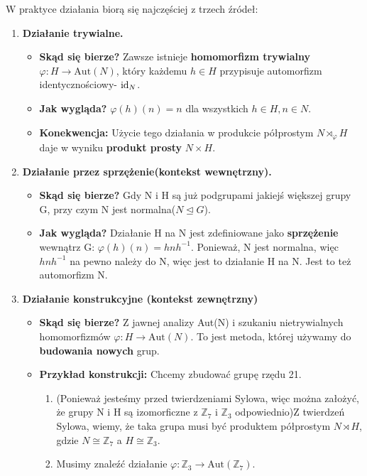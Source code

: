 \begin{remark}
W praktyce działania biorą się najczęściej z trzech źródeł:
\begin{enumerate}[label=\arabic*)]
	\item \textbf{Działanie trywialne.}
		\begin{itemize}
		\item \textbf{Skąd się bierze?} Zawsze istnieje \textbf{homomorfizm trywialny} $\varphi: H \rightarrow \text{Aut}\left( N \right) $, który każdemu $h\in H$ przypisuje automorfizm identycznościowy- $\operatorname{id}_{N}$.
		\item \textbf{Jak wygląda?} $\varphi\left( h \right) \left( n \right) = n$ dla wszystkich $h\in H, n\in N$.
		\item \textbf{Konekwencja:} Użycie tego działania w produkcie półprostym $N\rtimes_{\varphi}H$ daje w wyniku \textbf{produkt prosty } $N\times H$.
		\end{itemize}
	\item \textbf{Działanie przez sprzężenie(kontekst wewnętrzny).} 	       \begin{itemize}
			\item \textbf{Skąd się bierze? } Gdy N i H są już podgrupami jakiejś większej grupy G, przy czym N jest normalna($N\unlhd G$). 
			\item \textbf{Jak wygląda? } Działanie  H na N jest zdefiniowane jako  \textbf{sprzężenie} wewnątrz G: $\varphi\left( h \right) \left( n \right) = hnh^{-1}$. Ponieważ, N jest normalna, więc  $hnh^{-1}$ na pewno należy do N, więc jest to działanie H na N. Jest to też automorfizm N.  
		\end{itemize}
	\item \textbf{Działanie konstrukcyjne (kontekst zewnętrzny)} 
		\begin{itemize}
			\item \textbf{Skąd się bierze? } Z jawnej analizy Aut(N) i szukaniu nietrywialnych homomorfizmów $\varphi: H\rightarrow \text{Aut}\left( N \right) $. To jest metoda, której używamy do \textbf{budowania nowych} grup.
			\item \textbf{Przykład konstrukcji: } Chcemy zbudować grupę rzędu 21.
				\begin{enumerate}[label=\roman*)]
					\item (Ponieważ jesteśmy przed twierdzeniami Sylowa, więc można założyć, że grupy N i H są izomorficzne z $\mathbb{Z}_7$ i $\mathbb{Z}_3$ odpowiednio)Z twierdzeń Sylowa, wiemy, że taka grupa musi być produktem półprostym $N\rtimes H$, gdzie $N \cong \mathbb{Z}_7$ a $H \cong \mathbb{Z}_3$.
					\item Musimy znaleźć działanie $\varphi: \mathbb{Z}_3 \rightarrow \text{Aut}\left( \mathbb{Z}_7 \right)$.

\end{enumerate}
\end{itemize}
\end{enumerate}
\end{remark}
